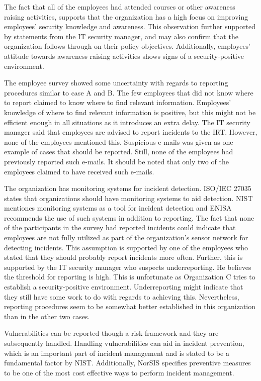 The fact that all of the employees had attended courses or other awareness raising activities, supports that the organization has a high focus on improving employees' security knowledge and awareness. This observation further supported by statements from the IT security manager, and may also confirm that the organization follows through on their policy objectives. Additionally, employees' attitude towards awareness raising activities shows signs of a security-positive environment.  
 
The employee survey showed some uncertainty with regards to reporting procedures similar to case A and B. The few employees that did not know where to report claimed to know where to find relevant information. Employees' knowledge of where to find relevant information is positive, but this might not be efficient enough in all situations as it introduces an extra delay. The IT security manager said that employees are advised to report incidents to the \ac{IRT}. However, none of the employees mentioned this. Suspicious e-mails was given as one example of cases that should be reported. Still, none of the employees had previously reported such e-mails. It should be noted that only two of the employees claimed to have received such e-mails. 

The organization has monitoring systems for incident detection. ISO/IEC 27035 states that organizations should have monitoring systems to aid detection. NIST mentiones monitoring systems as a tool for incident detection and ENISA recommends the use of such systems in addition to reporting. The fact that none of the participants in the survey had reported incidents could indicate that employees are not fully utilized as part of the organization's sensor network for detecting incidents. This assumption is supported by one of the employees who stated that they should probably report incidents more often. Further, this is supported by the IT security manager who suspects underreporting. He believes the threshold for reporting is high. This is unfortunate as Organization C tries to establish a security-positive environment. Underreporting might indicate that they still have some work to do with regards to achieving this. Nevertheless, reporting procedures seem to be somewhat better established in this organization than in the other two cases. 

Vulnerabilities can be reported though a risk framework and they are subsequently handled. Handling vulnerabilities can aid in incident prevention, which is an important part of incident management and is stated to be a fundamental factor by NIST. Additionally, NorSIS specifies preventive measures to be one of the most cost effective ways to perform incident management. 

